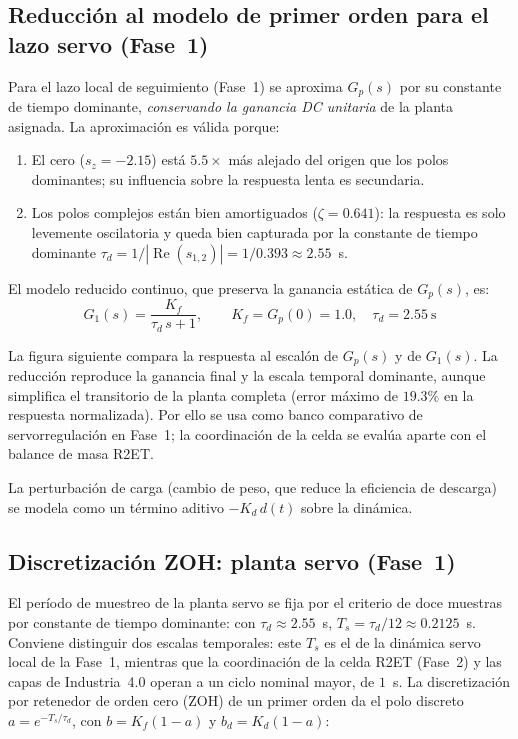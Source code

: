 \subsection*{Reducción al modelo de primer orden para el lazo servo (Fase~1)}

Para el lazo local de seguimiento (Fase~1) se aproxima $G_p(s)$ por su constante de tiempo dominante, \emph{conservando la ganancia DC unitaria} de la planta asignada. La aproximación es válida porque:
\begin{enumerate}
  \item El cero ($s_z=-2.15$) está $5.5\times$ más alejado del origen que los polos dominantes; su influencia sobre la respuesta lenta es secundaria.
  \item Los polos complejos están bien amortiguados ($\zeta=0.641$): la respuesta es solo levemente oscilatoria y queda bien capturada por la constante de tiempo dominante $\tau_d = 1/|\operatorname{Re}(s_{1,2})| = 1/0.393 \approx 2.55$~s.
\end{enumerate}

El modelo reducido continuo, que preserva la ganancia estática de $G_p(s)$, es:
\begin{equation}
G_1(s) = \frac{K_f}{\tau_d\,s + 1}, \qquad K_f = G_p(0) = 1.0,\quad \tau_d = 2.55~\text{s}
\label{eq:planta_reducida}
\end{equation}

La figura siguiente compara la respuesta al escalón de $G_p(s)$ y de $G_1(s)$. La reducción reproduce la ganancia final y la escala temporal dominante, aunque simplifica el transitorio de la planta completa (error máximo de $19.3\%$ en la respuesta normalizada). Por ello se usa como banco comparativo de servorregulación en Fase~1; la coordinación de la celda se evalúa aparte con el balance de masa R2ET.


La perturbación de carga (cambio de peso, que reduce la eficiencia de descarga) se modela como un término aditivo $-K_d\,d(t)$ sobre la dinámica.

\subsection*{Discretización ZOH: planta servo (Fase~1)}

El período de muestreo de la planta servo se fija por el criterio de doce muestras por constante de tiempo dominante: con $\tau_d \approx 2.55$~s, $T_s = \tau_d/12 \approx 0.2125$~s. Conviene distinguir dos escalas temporales: este $T_s$ es el de la dinámica servo local de la Fase~1, mientras que la coordinación de la celda R2ET (Fase~2) y las capas de Industria~4.0 operan a un ciclo nominal mayor, de $1$~s. La discretización por retenedor de orden cero (ZOH) de un primer orden da el polo discreto $a = e^{-T_s/\tau_d}$, con $b = K_f(1-a)$ y $b_d = K_d(1-a)$:

